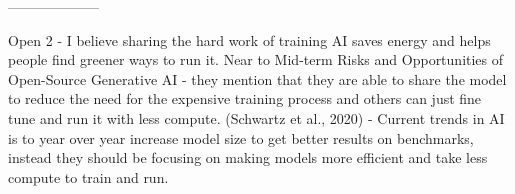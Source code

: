 --------------------

Open 2 - I believe sharing the hard work of training AI saves energy and helps people find greener ways to run it.
Near to Mid-term Risks and Opportunities of Open-Source Generative AI
\citep{touvron_llama_2023} - they mention that they are able to share the model to reduce the need for the expensive training process and others can just fine tune and run it with less compute.
(Schwartz et al., 2020)
\citep{schwartz_green_2019} - Current trends in AI is to year over year increase model size to get better results on benchmarks, instead they should be focusing on making models more efficient and take less compute to train and run.